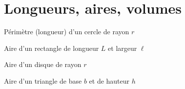 \documentclass[10pt,class=article,crop=false]{standalone}
\begin{document}
\section{Longueurs, aires, volumes}

\begin{multicols}{2}
	

	
\begin{center}
Périmètre (longueur) d'un cercle de rayon $r$

\begin{minipage}{0.2\textwidth}	
\end{minipage}
\begin{minipage}{0.25\textwidth}
\end{minipage}
\end{center}

\bigskip

\begin{center}
Aire d'un rectangle de longueur $L$ et largeur $\ell$
	
\begin{minipage}{0.2\textwidth}	
\end{minipage}
\begin{minipage}{0.25\textwidth}
\end{minipage}
\end{center}

\bigskip

\begin{center}
Aire d'un disque de rayon $r$

	\begin{minipage}{0.2\textwidth}	
	\end{minipage}
	\begin{minipage}{0.25\textwidth}
	\end{minipage}
\end{center}

\bigskip
	
\begin{center}
Aire d'un triangle de base $b$ et de hauteur $h$
	
	\begin{minipage}{0.2\textwidth}	
	\end{minipage}
	\begin{minipage}{0.25\textwidth}
	\end{minipage}
\end{center}


\end{multicols}
\end{document}
